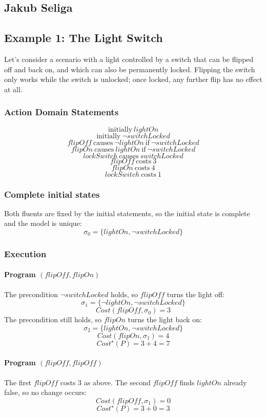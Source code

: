 \documentclass[11pt]{article}
\begin{document}
\subsection*{Jakub Seliga}
\subsection*{Example 1: The Light Switch}
Let's consider a scenario with a light controlled by a switch that can be flipped off and back on, and which can also be permanently locked. Flipping the switch only works while the switch is unlocked; once locked, any further flip has no effect at all.
\subsubsection*{Action Domain Statements}
\[
\text{initially}~ lightOn
\]
\[
\text{initially}~ \neg switchLocked
\]
\[
flipOff ~\text{causes}~ \neg lightOn ~\text{if}~ \neg switchLocked
\]
\[
flipOn ~\text{causes}~ lightOn ~\text{if}~ \neg switchLocked
\]
\[
lockSwitch ~\text{causes}~ switchLocked
\]
\[
flipOff ~\text{costs}~ 3
\]
\[
flipOn ~\text{costs}~ 4
\]
\[
lockSwitch ~\text{costs}~ 1
\]
\subsubsection*{Complete initial states}
Both fluents are fixed by the initial statements, so the initial state is complete and the model is unique:
\[
\sigma_0 = \{lightOn, \neg switchLocked\}
\]
\subsubsection*{Execution}
\paragraph{Program $(flipOff, flipOn)$}
The precondition $\neg switchLocked$ holds, so $flipOff$ turns the light off:
\[
\sigma_1 = \{\neg lightOn, \neg switchLocked\}
\]
\[
Cost(flipOff, \sigma_0) = 3
\]
The precondition still holds, so $flipOn$ turns the light back on:
\[
\sigma_2 = \{lightOn, \neg switchLocked\}
\]
\[
Cost(flipOn, \sigma_1) = 4
\]
\[
Cost^\star(P) = 3 + 4 = 7
\]
\paragraph{Program $(flipOff, flipOff)$}
The first $flipOff$ costs 3 as above. The second $flipOff$ finds $lightOn$ already false, so no change occurs:
\[
Cost(flipOff, \sigma_1) = 0
\]
\[
Cost^\star(P) = 3 + 0 = 3
\]
\end{document}
